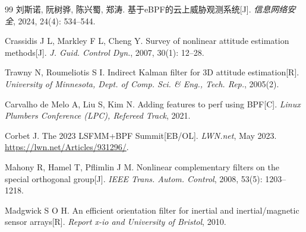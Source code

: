 \documentclass{rjthesis}
\begin{document}
\begin{thebibliography}{99}
 刘斯诺, 阮树骅, 陈兴蜀, 郑涛. 基于eBPF的云上威胁观测系统[J]. \textit{信息网络安全}, 2024, 24(4): 534--544.

 Crassidis J L, Markley F L, Cheng Y. Survey of nonlinear attitude estimation methods[J]. \textit{J. Guid. Control Dyn.}, 2007, 30(1): 12--28.

 Trawny N, Roumeliotis S I. Indirect Kalman filter for 3D attitude estimation[R]. \textit{University of Minnesota, Dept. of Comp. Sci. \& Eng., Tech. Rep.}, 2005(2).

 Carvalho de Melo A, Liu S, Kim N. Adding features to perf using BPF[C]. \textit{Linux Plumbers Conference (LPC), Refereed Track}, 2021.

 Corbet J. The 2023 LSFMM+BPF Summit[EB/OL]. \textit{LWN.net}, May 2023. \url{https://lwn.net/Articles/931296/}.

 Mahony R, Hamel T, Pflimlin J M. Nonlinear complementary filters on the special orthogonal group[J]. \textit{IEEE Trans. Autom. Control}, 2008, 53(5): 1203--1218.

 Madgwick S O H. An efficient orientation filter for inertial and inertial/magnetic sensor arrays[R]. \textit{Report x-io and University of Bristol}, 2010.

\end{thebibliography}
\end{document}
